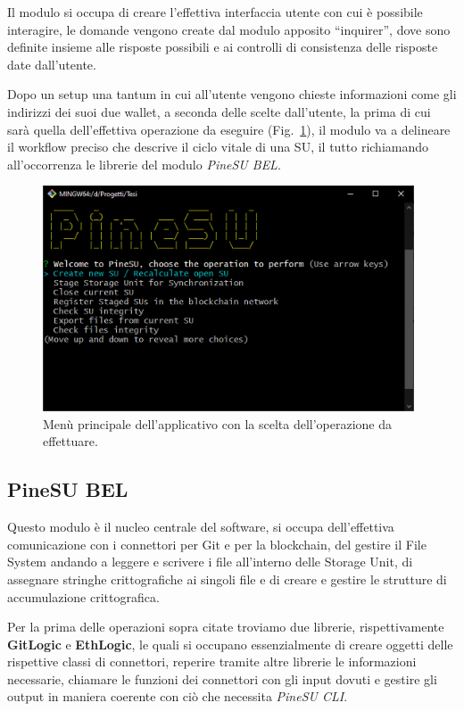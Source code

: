 Il modulo si occupa di creare l’effettiva interfaccia utente con cui è possibile interagire,
le domande vengono create dal modulo apposito “inquirer”, dove sono definite
insieme alle risposte possibili e ai controlli di consistenza delle risposte date dall’utente.

Dopo un setup una tantum in cui all’utente vengono chieste informazioni come gli indirizzi dei
suoi due wallet, a seconda delle scelte dall’utente, la prima di cui sarà quella dell’effettiva
operazione da eseguire (Fig.~\ref{fi:menu}), il modulo va a delineare il workflow preciso che descrive il ciclo vitale
di una SU, il tutto richiamando all’occorrenza le librerie del modulo \emph{PineSU BEL}. 

\begin{figure}[H]
    \centering
    \includegraphics[width=0.98\textwidth]{Figures/menu}
    \caption{\small{
    Menù principale dell’applicativo con la scelta dell’operazione da effettuare.
    } %
    } %
    \label{fi:menu}
\end{figure}

\subsection{PineSU BEL}

Questo modulo è il nucleo centrale del software, si occupa dell’effettiva comunicazione con i connettori per Git e per la blockchain, del gestire il File System andando a leggere e scrivere i file all’interno delle Storage Unit, di assegnare stringhe crittografiche ai singoli file e di creare e gestire le strutture di accumulazione crittografica.

Per la prima delle operazioni sopra citate troviamo due librerie, rispettivamente \textbf{GitLogic} e \textbf{EthLogic}, le quali si occupano essenzialmente di creare oggetti delle rispettive classi di connettori, reperire tramite altre librerie le informazioni necessarie, chiamare le funzioni dei connettori con gli input dovuti e gestire gli output in maniera coerente con ciò che necessita \emph{PineSU CLI}.

